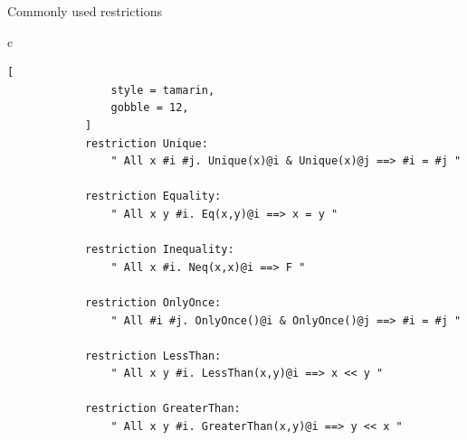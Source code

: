 \documentclass[11pt,aspectratio=169]{beamer}
\begin{document}
\begin{frame}[fragile]{Commonly used restrictions}
    \begin{center}
        \begin{tabular}{c}
            \toprule
            \begin{lstlisting}[
                style = tamarin,
                gobble = 12,
            ]
            restriction Unique:
                " All x #i #j. Unique(x)@i & Unique(x)@j ==> #i = #j "

            restriction Equality:
                " All x y #i. Eq(x,y)@i ==> x = y "

            restriction Inequality:
                " All x #i. Neq(x,x)@i ==> F "

            restriction OnlyOnce:
                " All #i #j. OnlyOnce()@i & OnlyOnce()@j ==> #i = #j "

            restriction LessThan:
                " All x y #i. LessThan(x,y)@i ==> x << y "

            restriction GreaterThan:
                " All x y #i. GreaterThan(x,y)@i ==> y << x "
            \end{lstlisting}\\
            \bottomrule
        \end{tabular}
    \end{center}
\end{frame}
\end{document}
